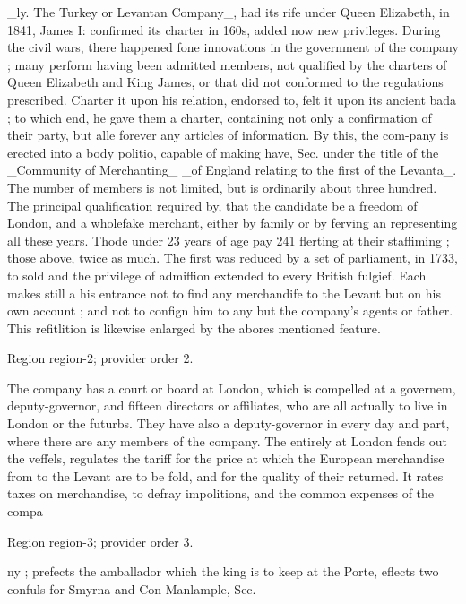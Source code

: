 \documentclass[11pt]{article}
\begin{document}
\_ly. The Turkey or Levantan Company\_, had its rife under Queen Elizabeth, in 1841, James I: confirmed its charter in 160s, added now new privileges. During the civil wars, there happened fone innovations in the government of the company ; many perform having been admitted members, not qualified by the charters of Queen Elizabeth and King James, or that did not conformed to the regulations prescribed. Charter it upon his relation, endorsed to, felt it upon its ancient bada ; to which end, he gave them a charter, containing not only a confirmation of their party, but alle forever any articles of information. By this, the com-pany is erected into a body politio, capable of making have, Sec. under the title of the \_Community of Merchanting\_ \_of England relating to the first of the Levanta\_. The number of members is not limited, but is ordinarily about three hundred. The principal qualification required by, that the candidate be a freedom of London, and a wholefake merchant, either by family or by ferving an representing all these years. Thode under 23 years of age pay 241 flerting at their staffiming ; those above, twice as much. The first was reduced by a set of parliament, in 1733, to sold and the privilege of admiffion extended to every British fulgief. Each makes still a his entrance not to find any merchandife to the Levant but on his own account ; and not to confign him to any but the company’s agents or father. This refitlition is likewise enlarged by the abores mentioned feature.
\par

{\scriptsize\color{gray} Region region-2; provider order 2.\par}
\medskip

The company has a court or board at London, which is compelled at a governem, deputy-governor, and fifteen directors or affiliates, who are all actually to live in London or the futurbs. They have also a deputy-governor in every day and part, where there are any members of the company. The entirely at London fends out the veffels, regulates the tariff for the price at which the European merchandise from to the Levant are to be fold, and for the quality of their returned. It rates taxes on merchandise, to defray impolitions, and the common expenses of the compa
\par

{\scriptsize\color{gray} Region region-3; provider order 3.\par}
\medskip

ny ; prefects the amballador which the king is to keep at the Porte, eflects two confuls for Smyrna and Con-Manlample, Sec.
\par
\end{document}
